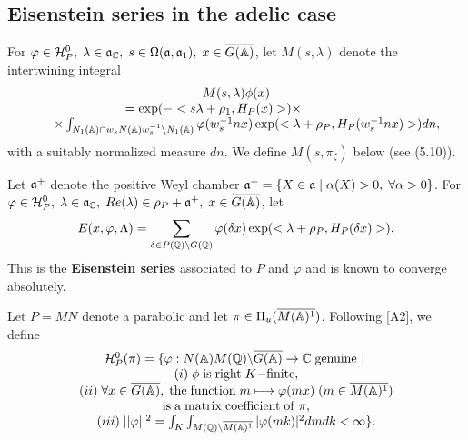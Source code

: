 \subsection{Eisenstein series in the adelic case}

For $\varphi \in {\cal H}_P^0,\;\lambda \in {\frak{a}}_{{\Bbb C}},\;s\in
\Omega ({\frak{a}},{\frak{a}}_1),\;x\in \overline{G({\Bbb{A}})}$, let
$M(s,\lambda)$ denote the intertwining integral
\begin{equation}
\begin{array}{c}
M(s,\lambda )\phi(x) \\ 
=\exp (-<s\lambda +\rho _1,H_P(x)>)\times \;\;\;\;\;\;\;\;\;\;\;\;\; \\ 
\;\;\;\;\;\;\times
\int_{N_1({\Bbb{A}})\cap w_sN({\Bbb{A}})w_s^{-1}\backslash
N_1({\Bbb{A}})}\varphi (w_s^{-1}nx)
\exp (<\lambda +\rho_P,H_P(w_s^{-1}nx)>)dn,
\end{array}
\end{equation}
with a suitably normalized measure $dn$.
We define $M(s,\pi_\zeta)$ below (see (5.10)).

Let ${\frak{a}}^{+}$ denote the positive Weyl chamber ${\frak{a}}^{+}=\{X\in 
{\frak{a}}\;|\;\alpha (X)>0,\;\forall \alpha >0\}$.
For $\varphi \in {\cal{H}}_P^0,
\;\lambda \in {\frak{a}}_{{\Bbb C}},
\;Re(\lambda )\in \rho _P+{\frak{a}}^{+},
\;x\in \overline{G({\Bbb{A}})}$, let 
\begin{equation}
E(x,\varphi ,\Lambda )=
\sum_{\delta \in P({\Bbb{Q}})\backslash G({\Bbb{Q}})}
\varphi (\delta x)\exp (<\lambda +\rho _P,H_P(\delta x)>).
\end{equation}
This is the {\bf Eisenstein series} associated to $P$ and $\varphi $ and is
known to converge absolutely. 

Let $P=MN$ denote a parabolic and let
$\pi \in \Pi _u(\overline{M({\Bbb{A}})^1})$.
Following [A2], we define 
\begin{equation}
\begin{array}{c}
{\cal H}_P^0(\pi )=\{\varphi :N({\Bbb{A}})M({\Bbb{Q}})
\backslash \overline{G({\Bbb{A}})}\rightarrow {\Bbb C}\;
{\rm genuine\ }|\; \\ 
(i)\;\phi \;{\rm is\;right}\;K{\rm -finite,} \\ 
(ii)\;\forall x\in \overline{G({\Bbb{A}})},
\;{\rm the\;function}\;m\longmapsto \varphi (mx)
\;(m\in \overline{M({{\Bbb{A}}})^1}) \\ 
{\rm is\;a\;matrix\;coefficient\;of}\;\pi , \\ 
(iii)\;||\varphi ||^2
=\int_K\int_{M({\Bbb{Q}})\backslash \overline{M({\Bbb{A}})^1}}|
\varphi (mk)|^2dmdk<\infty \}.
\end{array}
\end{equation}

